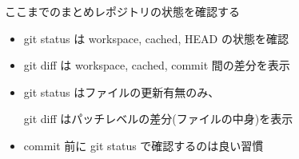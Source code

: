 % 
% 
% 
% 

\begin{frame}[t]{ここまでのまとめ}{レポジトリの状態を確認する}

  \begin{itemize}
  \item git status は workspace, cached, HEAD の状態を確認
    \vspace{2ex}

  \item git diff は workspace, cached, commit 間の差分を表示
    \vspace{2ex}

  \item git status はファイルの更新有無のみ、

    git diff はパッチレベルの差分(ファイルの中身)を表示
    \vspace{2ex}

  \item commit 前に git status で確認するのは良い習慣
  \end{itemize}

\end{frame}
